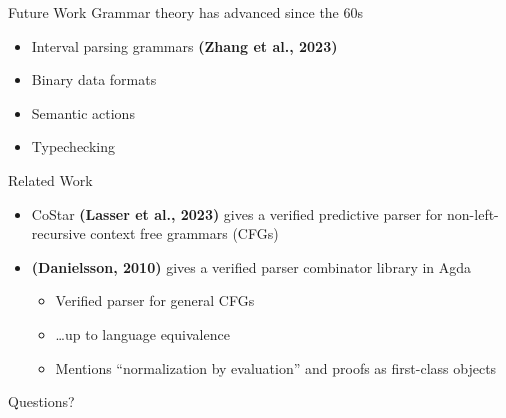 \documentclass[10pt]{beamer}
\makeatletter
\newif\ifdraft
\newcommand{\todoin}[1]{\ifdraft{\todo[inline]{TODO:\@ #1}}\fi}
\makeatother
\begin{document}
\begin{frame}{Future Work}
  Grammar theory has advanced since the 60s
  \begin{itemize}
    \item<2-> Interval parsing grammars \textbf{(Zhang et al., 2023)}
    \item<3-> Binary data formats
  \end{itemize}

  \begin{itemize}
    \item<5-> Semantic actions
    \item<6-> Typechecking
  \end{itemize}
\end{frame}

\begin{frame}{Related Work}
  \begin{itemize}
    \item<1-> CoStar \textbf{(Lasser et al., 2023)} gives a verified predictive
          parser for non-left-recursive context free grammars (CFGs)
    \item<2-> \textbf{(Danielsson, 2010)} gives a verified parser combinator library
          in Agda
      \begin{itemize}
        \item<3-> Verified parser for general CFGs
        \item<4-> \dots up to language equivalence
        \item<5-> Mentions ``normalization by evaluation'' and proofs as
              first-class objects
      \end{itemize}
  \end{itemize}
  \todoin{Less text, expand on Danielsson}
\end{frame}

\begin{frame}[standout]
  Questions?
\end{frame}
\end{document}
